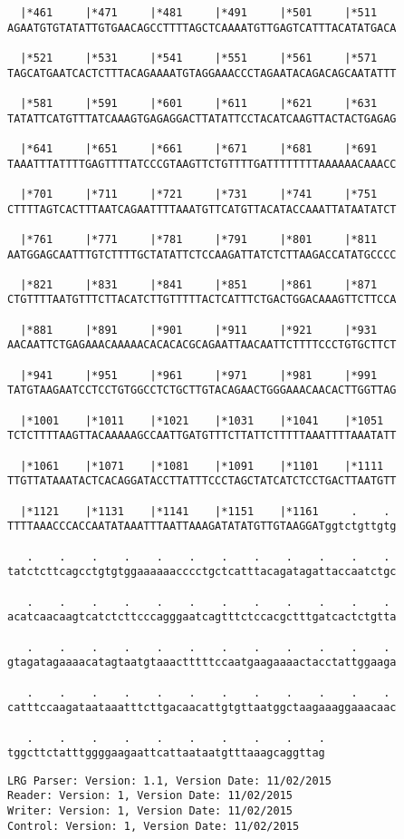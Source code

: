 \documentclass{article}
\begin{document}
\begin{Verbatim}
  |*461     |*471     |*481     |*491     |*501     |*511   
AGAATGTGTATATTGTGAACAGCCTTTTAGCTCAAAATGTTGAGTCATTTACATATGACA
  
  |*521     |*531     |*541     |*551     |*561     |*571   
TAGCATGAATCACTCTTTACAGAAAATGTAGGAAACCCTAGAATACAGACAGCAATATTT
  
  |*581     |*591     |*601     |*611     |*621     |*631   
TATATTCATGTTTATCAAAGTGAGAGGACTTATATTCCTACATCAAGTTACTACTGAGAG
  
  |*641     |*651     |*661     |*671     |*681     |*691   
TAAATTTATTTTGAGTTTTATCCCGTAAGTTCTGTTTTGATTTTTTTTAAAAAACAAACC
  
  |*701     |*711     |*721     |*731     |*741     |*751   
CTTTTAGTCACTTTAATCAGAATTTTAAATGTTCATGTTACATACCAAATTATAATATCT
  
  |*761     |*771     |*781     |*791     |*801     |*811   
AATGGAGCAATTTGTCTTTTGCTATATTCTCCAAGATTATCTCTTAAGACCATATGCCCC
  
  |*821     |*831     |*841     |*851     |*861     |*871   
CTGTTTTAATGTTTCTTACATCTTGTTTTTACTCATTTCTGACTGGACAAAGTTCTTCCA
  
  |*881     |*891     |*901     |*911     |*921     |*931   
AACAATTCTGAGAAACAAAAACACACACGCAGAATTAACAATTCTTTTCCCTGTGCTTCT
  
  |*941     |*951     |*961     |*971     |*981     |*991   
TATGTAAGAATCCTCCTGTGGCCTCTGCTTGTACAGAACTGGGAAACAACACTTGGTTAG
  
  |*1001    |*1011    |*1021    |*1031    |*1041    |*1051  
TCTCTTTTAAGTTACAAAAAGCCAATTGATGTTTCTTATTCTTTTTAAATTTTAAATATT
  
  |*1061    |*1071    |*1081    |*1091    |*1101    |*1111  
TTGTTATAAATACTCACAGGATACCTTATTTCCCTAGCTATCATCTCCTGACTTAATGTT
  
  |*1121    |*1131    |*1141    |*1151    |*1161     .    . 
TTTTAAACCCACCAATATAAATTTAATTAAAGATATATGTTGTAAGGATggtctgttgtg
  
   .    .    .    .    .    .    .    .    .    .    .    . 
tatctcttcagcctgtgtggaaaaaacccctgctcatttacagatagattaccaatctgc
  
   .    .    .    .    .    .    .    .    .    .    .    . 
acatcaacaagtcatctcttcccagggaatcagtttctccacgctttgatcactctgtta
  
   .    .    .    .    .    .    .    .    .    .    .    . 
gtagatagaaaacatagtaatgtaaactttttccaatgaagaaaactacctattggaaga
  
   .    .    .    .    .    .    .    .    .    .    .    . 
catttccaagataataaatttcttgacaacattgtgttaatggctaagaaaggaaacaac
  
   .    .    .    .    .    .    .    .    .    .
tggcttctatttggggaagaattcattaataatgtttaaagcaggttag
\end{Verbatim}
\newpage
\begin{Verbatim}
LRG Parser: Version: 1.1, Version Date: 11/02/2015
Reader: Version: 1, Version Date: 11/02/2015
Writer: Version: 1, Version Date: 11/02/2015
Control: Version: 1, Version Date: 11/02/2015
\end{Verbatim}
\end{document}
